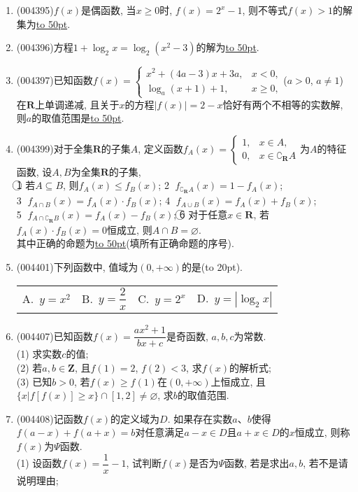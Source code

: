 \documentclass[10pt,a4paper]{article}
\newcommand{\blank}[1]{\underline{\hbox to #1pt{}}}
\newcommand{\bracket}[1]{(\hbox to #1pt{})}
\newcommand{\fourch}[4]{\par\begin{tabular}{p{.23\textwidth}p{.23\textwidth}p{.23\textwidth}p{.23\textwidth}}
A.~#1 &B.~#2& C.~#3& D.~#4
\end{tabular}}
\begin{document}
\begin{enumerate}[1.]
\item {\tiny (004395)}$f(x)$是偶函数, 当$x\ge 0$时, $f(x)=2^x-1$, 则不等式$f(x)>1$的解集为\blank{50}.
\item {\tiny (004396)}方程$1+\log_2x=\log_2(x^2-3)$的解为\blank{50}.
\item {\tiny (004397)}已知函数$f(x)=\begin{cases}  x^2+(4a-3)x+3a,& x<0, \\ \log_a(x+1)+1,& x\ge 0, \end{cases}$($a>0$, $a\ne 1$)在$\mathbf{R}$上单调递减, 且关于$x$的方程$|f(x)|=2-x$恰好有两个不相等的实数解, 则$a$的取值范围是\blank{50}.
\item {\tiny (004399)}对于全集$\mathbf{R}$的子集$A$, 定义函数$f_A(x)=\begin{cases}
1, &  x\in A,  \\0, & x\in \complement_{\mathbf{R}}A  \end{cases}$为$A$的特征函数, 设$A,B$为全集$\mathbf{R}$的子集,\\
\textcircled{1} 若$A\subseteq B$, 则$f_A(x)\le f_B(x)$; \textcircled{2} $f_{\complement_{\mathbf{R}}A}(x)=1-f_A(x)$;\\
\textcircled{3} ${f_{A\cap B}}(x)=f_A(x)\cdot f_B(x)$; \textcircled{4} $f_{A\cup B}(x)=f_A(x)+f_B(x)$;\\ \textcircled{5} $f_{A\cap \complement_\mathbf{R}B}(x)=f_A(x)-f_B(x)$; \textcircled{6} 对于任意$x\in \mathbf{R}$, 若$f_A(x)\cdot f_B(x)=0$恒成立, 则$A\cap B=\varnothing$.\\
其中正确的命题为\blank{50}(填所有正确命题的序号).
\item {\tiny (004401)}下列函数中, 值域为$(0,+\infty)$的是\bracket{20}.
\fourch{$y=x^2$}{$y=\dfrac 2x$}{$y=2^x$}{$y=|\log_2x|$}
\item {\tiny (004407)}已知函数$f(x)=\dfrac{ax^2+1}{bx+c}$是奇函数, $a,b,c$为常数.\\
(1)	求实数$c$的值;\\
(2)	若$a,b\in \mathbf{Z}$, 且$f(1)=2$, $f(2)<3$, 求$f(x)$的解析式;\\
(3) 已知$b>0$, 若$f(x)\ge f(1)$在$(0,+\infty)$上恒成立, 且$\{x|f[f(x)]\ge x\}\cap [1,2]\ne \varnothing$, 求$b$的取值范围.
\item {\tiny (004408)}记函数$f(x)$的定义域为$D$. 如果存在实数$a$、$b$使得$f(a-x)+f(a+x)=b$对任意满足$a-x\in D$且$a+x\in D$的$x$恒成立, 则称$f(x)$为$\Psi$函数.\\
(1) 设函数$f(x)=\dfrac 1x-1$, 试判断$f(x)$是否为$\Psi$函数, 若是求出$a,b$, 若不是请说明理由;\\

\end{enumerate}
\end{document}
